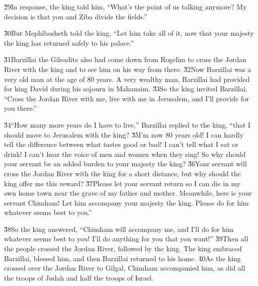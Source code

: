 \v{29}In response, the king told him, ``What's the point of us talking anymore? My decision is that you and Ziba divide the fields.''

\v{30}But Mephibosheth told the king, ``Let him take all of it, now that your majesty the king has returned safely to his palace.''

\v{31}Barzillai the Gileadite also had come down from Rogelim to cross the Jordan River with the king and to see him on his way from there. \v{32}Now Barzillai was a very old man at the age of 80 years. A very wealthy man, Barzillai had provided for king David during his sojourn in Mahanaim. \v{33}So the king invited Barzillai, ``Cross the Jordan River with me, live with me in Jerusalem, and I'll provide for you there.''

\v{34}``How many more years do I have to live,'' Barzillai replied to the king, ``that I should move to Jerusalem with the king? \v{35}I'm now 80 years old! I can hardly tell the difference between what tastes good or bad! I can't tell what I eat or drink! I can't hear the voice of men and women when they sing! So why should your servant be an added burden to your majesty the king? \v{36}Your servant will cross the Jordan River with the king for a short distance, but why should the king offer me this reward? \v{37}Please let your servant return so I can die in my own home town near the grave of my father and mother. Meanwhile, here is your servant Chimham! Let him accompany your majesty the king. Please do for him whatever seems best to you.''

\v{38}So the king answered, ``Chimham will accompany me, and I'll do for him whatever seems best to you! I'll do anything for you that you want!'' \v{39}Then all the people crossed the Jordan River, followed by the king. The king embraced Barzillai, blessed him, and then Barzillai returned to his home. \v{40}As the king crossed over the Jordan River to Gilgal, Chimham accompanied him, as did all the troops of Judah and half the troops of Israel.

